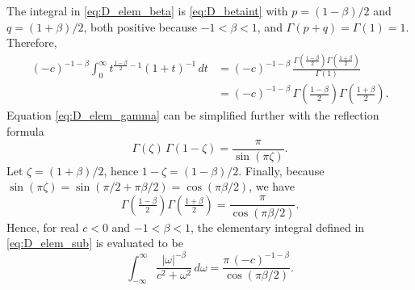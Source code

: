 \documentclass[12pt]{article}
\begin{document}
The integral in \eqref{eq:D_elem_beta} is \eqref{eq:D_betaint} with $p=(1-\beta)/2$ and $q=(1+\beta)/2$, both positive
because $-1<\beta<1$, and $\Gamma(p+q)=\Gamma(1)=1$.
Therefore,
\begin{equation}
\begin{aligned}
    (-c)^{-1-\beta}\int_0^\infty t^{\frac{1-\beta}{2}-1}(1+t)^{-1}\,dt
    &=(-c)^{-1-\beta}\,\frac{\Gamma\!\left(\frac{1-\beta}{2}\right)\Gamma\!\left(\frac{1+\beta}{2}\right)}{\Gamma(1)}\\
    &=(-c)^{-1-\beta}\,\Gamma\!\left(\tfrac{1-\beta}{2}\right)\Gamma\!\left(\tfrac{1+\beta}{2}\right).
\end{aligned}
    \label{eq:D_elem_gamma}
\end{equation}
Equation \eqref{eq:D_elem_gamma} can be simplified further with the reflection formula \href{https://press.princeton.edu/books/paperback/9780691113852/complex-analysis}{\citep{SteinShakarchi2003}}
\begin{equation}
    \Gamma(\zeta)\,\Gamma(1-\zeta)=\frac{\pi}{\sin(\pi\zeta)}.
    \label{eq:D_reflection}
\end{equation}
Let $\zeta=(1+\beta)/2$, hence $1-\zeta=(1-\beta)/2$. Finally, because
$\sin(\pi\zeta)=\sin(\pi/2+\pi\beta/2)=\cos(\pi\beta/2)$, we have
\begin{equation}
    \Gamma\!\left(\tfrac{1-\beta}{2}\right)\Gamma\!\left(\tfrac{1+\beta}{2}\right)=\frac{\pi}{\cos(\pi\beta/2)}.
    \label{eq:D_gamma_cos}
\end{equation}
Hence, for real $c<0$ and $-1<\beta<1$, the elementary integral defined in \eqref{eq:D_elem_sub} is evaluated to be
\begin{equation}
    \int_{-\infty}^{\infty}\frac{|\omega|^{-\beta}}{c^2+\omega^2}\,d\omega
    = \frac{\pi\,(-c)^{-1-\beta}}{\cos(\pi\beta/2)} .
    \label{eq:D_elem}
\end{equation}
\end{document}
